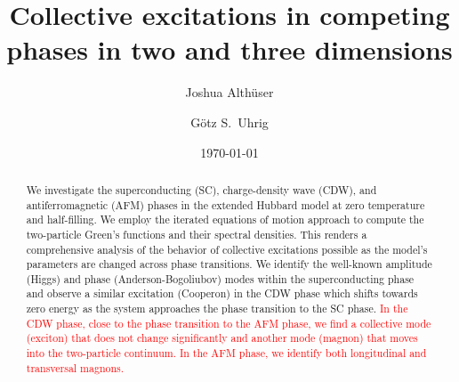 \documentclass[
    reprint, 
    aps,
    preprintnumbers,
    twocolumn,
    prb,
    superscriptaddress
]{revtex4-2}
\begin{document}
 

\title{Collective excitations in competing phases in two and three dimensions}


\author{Joshua Alth\"user}

\author{G\"otz S.~Uhrig}

\date{\today}

\begin{abstract}
    We investigate the superconducting (SC), charge-density wave (CDW), and antiferromagnetic (AFM) phases in the extended Hubbard model at zero temperature and half-filling. 
    We employ the iterated equations of motion approach to compute the two-particle Green's functions and their spectral densities. 
    This renders a comprehensive analysis of the behavior of collective excitations possible as the model's parameters are changed across phase transitions. 
    We identify the well-known amplitude (Higgs) and phase (Anderson-Bogoliubov) modes within the superconducting phase 
    and observe a similar excitation (Cooperon) in the CDW phase which shifts towards zero energy as the system approaches the phase transition to the SC phase. 
    \textcolor{red}{In the CDW phase, close to the phase transition to the AFM phase, 
    we find a collective mode (exciton) that does not change significantly and another mode (magnon) that moves into the two-particle continuum. 
    In the AFM phase, we identify both longitudinal and transversal magnons.}
\end{abstract}

\maketitle
\end{document}

